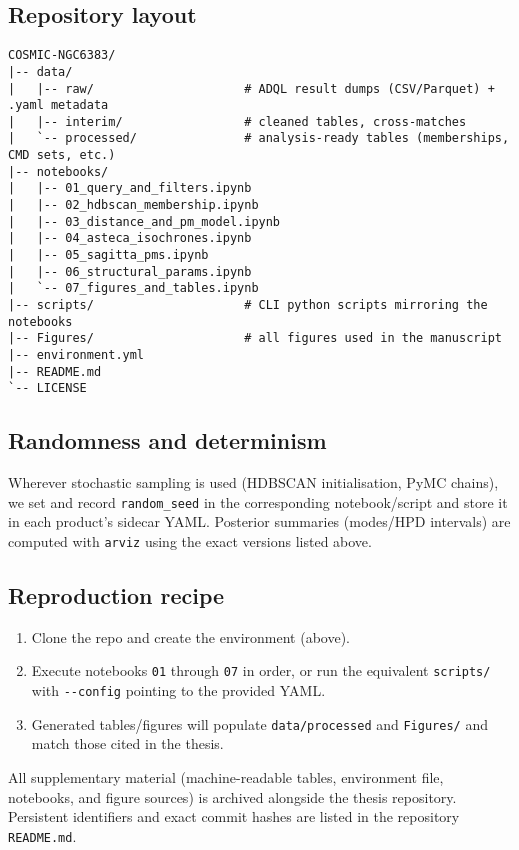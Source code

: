 \documentclass[../main.tex]{subfiles}
\begin{document}
\subsection{Repository layout}
\begin{verbatim}
COSMIC-NGC6383/
|-- data/
|   |-- raw/                     # ADQL result dumps (CSV/Parquet) + .yaml metadata
|   |-- interim/                 # cleaned tables, cross-matches
|   `-- processed/               # analysis-ready tables (memberships, CMD sets, etc.)
|-- notebooks/
|   |-- 01_query_and_filters.ipynb
|   |-- 02_hdbscan_membership.ipynb
|   |-- 03_distance_and_pm_model.ipynb
|   |-- 04_asteca_isochrones.ipynb
|   |-- 05_sagitta_pms.ipynb
|   |-- 06_structural_params.ipynb
|   `-- 07_figures_and_tables.ipynb
|-- scripts/                     # CLI python scripts mirroring the notebooks
|-- Figures/                     # all figures used in the manuscript
|-- environment.yml
|-- README.md
`-- LICENSE
\end{verbatim}

\subsection{Randomness and determinism}
Wherever stochastic sampling is used (HDBSCAN initialisation, PyMC chains), we set and record \verb|random_seed| in the corresponding notebook/script and store it in each product’s sidecar YAML. Posterior summaries (modes/HPD intervals) are computed with \texttt{arviz} using the exact versions listed above.

\subsection{Reproduction recipe}
\begin{enumerate}
  \item Clone the repo and create the environment (above).
  \item Execute notebooks \texttt{01} through \texttt{07} in order, or run the equivalent \verb|scripts/| with \verb|--config| pointing to the provided YAML.
  \item Generated tables/figures will populate \verb|data/processed| and \verb|Figures/| and match those cited in the thesis.
\end{enumerate}

\bigskip
All supplementary material (machine-readable tables, environment file, notebooks, and figure sources) is archived alongside the thesis repository. Persistent identifiers and exact commit hashes are listed in the repository \verb|README.md|.

\biblio
\end{document}
